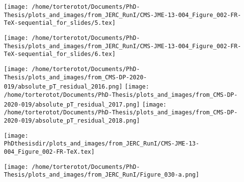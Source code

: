 \begin{frame}[t]
\addtocounter{framenumber}{-1}
\large
\texttt{[image: /home/torterotot/Documents/PhD-Thesis/plots\_and\_images/from\_JERC\_RunI/CMS-JME-13-004\_Figure\_002-FR-TeX-sequential\_for\_slides/5.tex]}
\end{frame}

\begin{frame}[t]
\addtocounter{framenumber}{-1}
\large
\texttt{[image: /home/torterotot/Documents/PhD-Thesis/plots\_and\_images/from\_JERC\_RunI/CMS-JME-13-004\_Figure\_002-FR-TeX-sequential\_for\_slides/6.tex]}

\vfill

\texttt{[image: /home/torterotot/Documents/PhD-Thesis/plots\_and\_images/from\_CMS-DP-2020-019/absolute\_pT\_residual\_2016.png]}
\hfill
\texttt{[image: /home/torterotot/Documents/PhD-Thesis/plots\_and\_images/from\_CMS-DP-2020-019/absolute\_pT\_residual\_2017.png]}
\hfill
\texttt{[image: /home/torterotot/Documents/PhD-Thesis/plots\_and\_images/from\_CMS-DP-2020-019/absolute\_pT\_residual\_2018.png]}
\end{frame}

\begin{frame}[t]
\addtocounter{framenumber}{-1}
\large
\texttt{[image: \\PhDthesisdir/plots\_and\_images/from\_JERC\_RunI/CMS-JME-13-004\_Figure\_002-FR-TeX.tex]}

\vfill

\begin{center}
\texttt{[image: /home/torterotot/Documents/PhD-Thesis/plots\_and\_images/from\_JERC\_RunI/Figure\_030-a.png]}
\end{center}
\end{frame}

